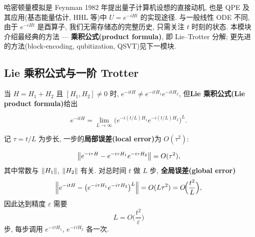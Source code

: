 \documentclass[utf8]{article} %
\numberwithin{equation}{section}   %
\newtheorem{Thm}{\hskip 2em {\color{blue} 定理}}[subsection]
\newtheorem{Note}{\hskip 2em {\color{red} 注}}[subsection]
\begin{document}
\begin{Note}
    哈密顿量模拟是 Feynman 1982 年提出量子计算机设想的直接动机, 
    也是 QPE 及其应用(基态能量估计, HHL 等)中 $U = e^{-iHt}$ 的实现途径.
    与一般线性 ODE 不同, 由于 $e^{-iHt}$ 是酉算子, 我们无需存储态的完整历史, 
    只需关注 $t$ 时刻的状态. 本模块介绍最经典的方法 --- \textbf{乘积公式(product formula)},
    即 Lie--Trotter 分解; 更先进的方法(block-encoding, qubitization, QSVT)见下一模块.
\end{Note}

\subsection{Lie 乘积公式与一阶 Trotter}

当 $H = H_1 + H_2$ 且 $[H_1, H_2] \neq 0$ 时, $e^{-itH} \neq e^{-itH_1}e^{-itH_2}$,
但\textbf{Lie 乘积公式(Lie product formula)}给出

\begin{equation}
    e^{-itH} = \lim_{L \to \infty} \Big(e^{-i(t/L)H_1} e^{-i(t/L)H_2}\Big)^{L}.
\end{equation}

记 $\tau = t/L$ 为步长, 一步的\textbf{局部误差(local error)}为 $O(\tau^2)$:

\begin{Thm}[一阶 Trotter 公式]
    \begin{equation}
        \norm{e^{-i\tau H} - e^{-i\tau H_1} e^{-i\tau H_2}} = O(\tau^2),
    \end{equation}
    其中常数与 $\norm{H_1}$, $\norm{H_2}$ 有关. 对总时间 $t$ 做 $L$ 步, \textbf{全局误差(global error)}
    \begin{equation}
        \norm{e^{-itH} - \big(e^{-i\tau H_1} e^{-i\tau H_2}\big)^{L}} = O(L\tau^2)
        = O\!\Big(\frac{t^2}{L}\Big),
    \end{equation}
    因此达到精度 $\varepsilon$ 需要
    \begin{equation}
        L = O\!\Big(\frac{t^2}{\varepsilon}\Big)
    \end{equation}
    步, 每步调用 $e^{-i\tau H_1}$, $e^{-i\tau H_2}$ 各一次.
\end{Thm}
\end{document}
